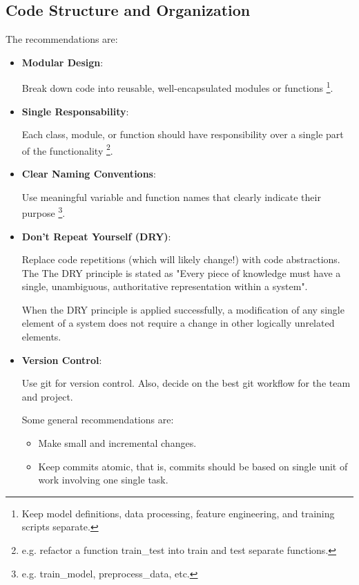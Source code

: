 \subsection{Code Structure and Organization}
The recommendations are:
\begin{itemize}
    \item \textbf{Modular Design}:
    
    \noindent 
    Break down code into reusable, well-encapsulated modules or
    functions
    \footnote{
        Keep model definitions, data processing, feature
        engineering, and training scripts separate.
    }.


    \item \textbf{Single Responsability}:
    
    \noindent
    Each class, module, or function should have responsibility over
    a single part of the functionality
    \footnote{
        e.g. refactor a function train\_test into train and test
        separate functions.
    }.


    \item \textbf{Clear Naming Conventions}:
    
    \noindent   
    Use meaningful variable and function names that clearly
    indicate their purpose
    \footnote{
        e.g. train\_model, preprocess\_data, etc.
    }.


    \item \textbf{Don't Repeat Yourself (DRY)}:
    
    \noindent
    Replace code repetitions (which will likely change!) with
    code abstractions. The The DRY principle is stated as "Every
    piece of knowledge must have a single, unambiguous,
    authoritative representation within a system".

    When the DRY principle is applied successfully, a modification
    of any single element of a system does not require a change
    in other logically unrelated elements. 


    \item \textbf{Version Control}:
    
    \noindent 
    Use git for version control. Also, decide on the best git
    workflow for the team and project.

    Some general recommendations are:
    \begin{itemize}
        \item Make small and incremental changes.
        
        \item Keep commits atomic, that is, commits should be based
        on single unit of work involving one single task.


\end{itemize}
\end{itemize}
